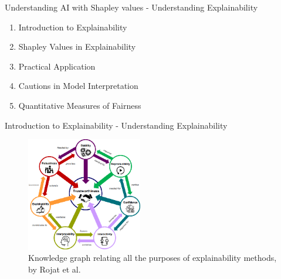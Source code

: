 \documentclass[aspectratio=169]{beamer}
\begin{document}
\begin{frame}{Understanding AI with Shapley values - Understanding Explainability}
    \begin{enumerate}
        \item Introduction to Explainability
        \item Shapley Values in Explainability
        \item Practical Application
        \item Cautions in Model Interpretation
        \item Quantitative Measures of Fairness
    \end{enumerate}
\end{frame}

\begin{frame}{Introduction to Explainability - Understanding Explainability}
    \begin{figure}[htbp]
        \centering
        \includegraphics[width=0.45\textwidth]{figs/xai/xai-cicle.png}
        \caption{Knowledge graph relating all the purposes of explainability methods, by Rojat et al. \cite{DBLP:journals/corr/abs-2104-00950}}
        \label{fig:xai-circle}
    \end{figure}
\end{frame}
\end{document}
